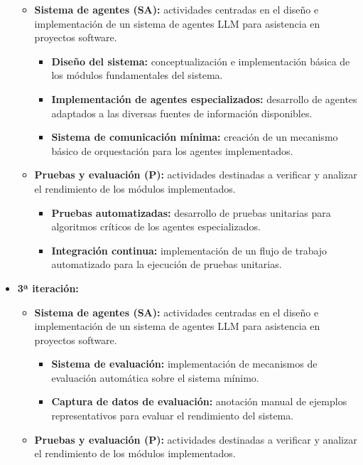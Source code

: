 \begin{itemize}
\begin{itemize}
      \item\textbf{Sistema de agentes (SA):} actividades centradas en el diseño e implementación de un sistema de agentes LLM para asistencia en proyectos software.
        \begin{itemize}
          \item\textbf{Diseño del sistema:} conceptualización e implementación básica de los módulos fundamentales del sistema.
          \item\textbf{Implementación de agentes especializados:} desarrollo de agentes adaptados a las diversas fuentes de información disponibles.
          \item\textbf{Sistema de comunicación mínima:} creación de un mecanismo básico de orquestación para los agentes implementados.
        \end{itemize}
      \item\textbf{Pruebas y evaluación (P):} actividades destinadas a verificar y analizar el rendimiento de los módulos implementados.
        \begin{itemize}
        \item\textbf{Pruebas automatizadas:} desarrollo de pruebas unitarias para algoritmos críticos de los agentes especializados.
        \item\textbf{Integración continua:} implementación de un flujo de trabajo automatizado para la ejecución de pruebas unitarias.
      \end{itemize}
    \end{itemize}
  \item\textbf{3ª iteración:}
    \begin{itemize}
      \item\textbf{Sistema de agentes (SA):} actividades centradas en el diseño e implementación de un sistema de agentes LLM para asistencia en proyectos software.
        \begin{itemize}
          \item\textbf{Sistema de evaluación:} implementación de mecanismos de evaluación automática sobre el sistema mínimo.
          \item\textbf{Captura de datos de evaluación:} anotación manual de ejemplos representativos para evaluar el rendimiento del sistema. 
        \end{itemize}
      \item\textbf{Pruebas y evaluación (P):} actividades destinadas a verificar y analizar el rendimiento de los módulos implementados.
        \begin{itemize}

\end{itemize}
\end{itemize}
\end{itemize}
